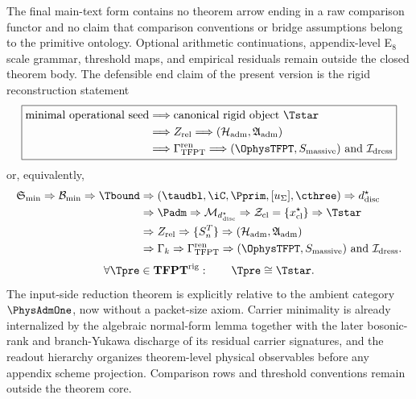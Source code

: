The final main-text form contains no theorem arrow ending in a raw comparison functor and no claim
that comparison conventions or bridge assumptions belong to the primitive ontology. Optional
arithmetic continuations, appendix-level E$_8$ scale grammar, threshold maps, and empirical
residuals remain outside the closed theorem body. The defensible end claim of the present version
is the rigid reconstruction statement
\[
\boxed{
\begin{aligned}
\text{minimal operational seed}
&\Longrightarrow \text{canonical rigid object }\Tstar\\
&\Longrightarrow Z_{\mathrm{rel}}
\Longrightarrow (\mathcal H_{\mathrm{adm}},\mathfrak A_{\mathrm{adm}})\\
&\Longrightarrow \Gamma_{\mathrm{TFPT}}^{\mathrm{ren}}
\Longrightarrow (\OphysTFPT,S_{\mathrm{massive}})
\ \text{and}\ \mathcal I_{\mathrm{dress}}
\end{aligned}}
\]
or, equivalently,
\[
\begin{aligned}
\mathfrak S_{\min}
\Rightarrow
\mathcal B_{\min}
\Rightarrow
\Tbound
&\Rightarrow
(\taudbl,\iC,\Pprim,[u_\Sigma],\cthree)
\Rightarrow
d^\star_{\mathrm{disc}}\\
&\Rightarrow
\Padm
\Rightarrow
\mathcal M_{d^\star_{\mathrm{disc}}}
\Rightarrow
\mathcal Z_{\mathrm{cl}}=\{x^\star_{\mathrm{cl}}\}
\Rightarrow
\Tstar\\
&\Rightarrow
Z_{\mathrm{rel}}
\Rightarrow
\{S_n^T\}
\Rightarrow
(\mathcal H_{\mathrm{adm}},\mathfrak A_{\mathrm{adm}})\\
&\Rightarrow
\Gamma_k
\Rightarrow
\Gamma_{\mathrm{TFPT}}^{\mathrm{ren}}
\Rightarrow
(\OphysTFPT,S_{\mathrm{massive}})
\ \text{and}\ \mathcal I_{\mathrm{dress}}.
\end{aligned}
\]
\[
\forall \Tpre\in\mathbf{TFPT}^{\mathrm{rig}}:\qquad
\Tpre\cong \Tstar.
\]
The input-side reduction theorem is explicitly relative to the ambient category
$\PhysAdmOne$, now without a packet-size axiom. Carrier minimality is already internalized by
the algebraic normal-form lemma together with the later bosonic-rank and branch-Yukawa discharge of
its residual carrier signatures, and
the readout hierarchy organizes theorem-level physical observables before any appendix scheme
projection. Comparison rows and threshold conventions remain outside the theorem core.

